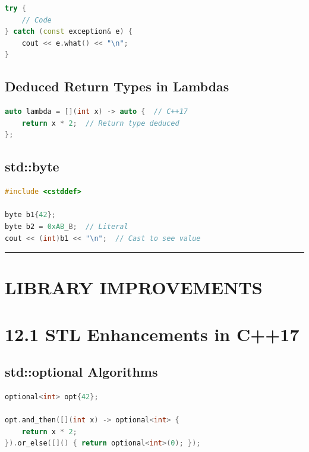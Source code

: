 \begin{lstlisting}[language={C++}]
try {
    // Code
} catch (const exception& e) {
    cout << e.what() << "\n";
}
\end{lstlisting}

\hypertarget{deduced-return-types-in-lambdas}{%
\subsection{Deduced Return Types in
Lambdas}\label{deduced-return-types-in-lambdas}}

\begin{lstlisting}[language={C++}]
auto lambda = [](int x) -> auto {  // C++17
    return x * 2;  // Return type deduced
};
\end{lstlisting}

\hypertarget{stdbyte}{%
\subsection{std::byte}\label{stdbyte}}

\begin{lstlisting}[language={C++}]
#include <cstddef>

byte b1{42};
byte b2 = 0xAB_B;  // Literal
cout << (int)b1 << "\n";  // Cast to see value
\end{lstlisting}

\begin{center}\rule{0.5\linewidth}{0.5pt}\end{center}

\hypertarget{library-improvements}{%
\section{LIBRARY IMPROVEMENTS}\label{library-improvements}}

\hypertarget{stl-enhancements-in-c17}{%
\section{12.1 STL Enhancements in C++17}\label{stl-enhancements-in-c17}}

\hypertarget{stdoptional-algorithms}{%
\subsection{std::optional Algorithms}\label{stdoptional-algorithms}}

\begin{lstlisting}[language={C++}]
optional<int> opt{42};

opt.and_then([](int x) -> optional<int> {
    return x * 2;
}).or_else([]() { return optional<int>(0); });
\end{lstlisting}

